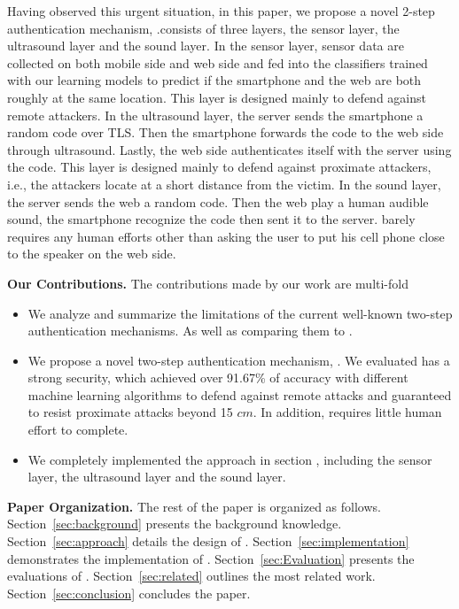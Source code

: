 Having observed this urgent situation, in this paper, we propose a novel 2-step authentication mechanism, \name.\Name consists of three layers, the sensor layer, the ultrasound layer and the sound layer. In the sensor layer, sensor data are collected on both mobile side and web side and fed into the classifiers trained with our learning models to predict if the smartphone and the web are both roughly at the same location. This layer is designed mainly to defend against remote attackers. In the ultrasound layer, the server sends the smartphone a random code over TLS. Then the smartphone forwards the code to the web side through ultrasound. Lastly, the web side authenticates itself with the server using the code. This layer is designed mainly to defend against proximate attackers, i.e., the attackers locate at a short distance from the victim. In the sound layer, the server sends the web a random code. Then the web play a human audible sound, the smartphone recognize the code then sent it to the server. \Name barely requires any human efforts other than asking the user to put his cell phone close to the speaker on the web side. 

\textbf{Our Contributions.} The contributions made by our work are multi-fold
\begin{itemize}
  \item We analyze and summarize the limitations of the current well-known 
  two-step authentication mechanisms. As well as comparing them to \name.
  
  \item We propose a novel two-step authentication mechanism, \Name . We evaluated \name has a strong security, which achieved over 91.67\% of accuracy with different machine learning algorithms to defend against remote attacks and guaranteed to resist proximate attacks beyond 15 $cm$. In addition, \Name requires little human effort to complete.  
  
  \item We completely implemented the approach in section \uppercase\expandafter{}, including the sensor layer, the ultrasound layer and the sound layer.
\end{itemize}

\textbf{Paper Organization.} 
The rest of the paper is organized as follows. Section~\ref{sec:background} presents the background knowledge. 
Section~\ref{sec:approach} details the design of \name. Section~\ref{sec:implementation} demonstrates the implementation of \name. Section~\ref{sec:Evaluation} presents the evaluations of \name. Section~\ref{sec:related} outlines the most related work. Section~\ref{sec:conclusion} concludes the paper.